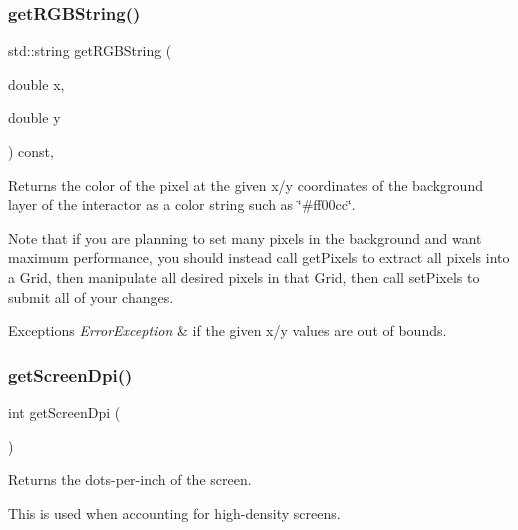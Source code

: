 \subsubsection{\texorpdfstring{get\+R\+G\+B\+String()}{getRGBString()}}
{\footnotesize\ttfamily std\+::string get\+R\+G\+B\+String (\begin{DoxyParamCaption}\item[{double}]{x,  }\item[{double}]{y }\end{DoxyParamCaption}) const\hspace{0.3cm}{\ttfamily [virtual]}, {\ttfamily [inherited]}}



Returns the color of the pixel at the given x/y coordinates of the background layer of the interactor as a color string such as \char`\"{}\#ff00cc\char`\"{}. 

Note that if you are planning to set many pixels in the background and want maximum performance, you should instead call get\+Pixels to extract all pixels into a Grid, then manipulate all desired pixels in that Grid, then call set\+Pixels to submit all of your changes.


\begin{DoxyExceptions}{Exceptions}
{\em Error\+Exception} & if the given x/y values are out of bounds. \\
\hline
\end{DoxyExceptions}
\mbox{\label{classsgl_1_1GWindow_aea783b75281f864f14e958d2fee28f9d}} 
\subsubsection{\texorpdfstring{get\+Screen\+Dpi()}{getScreenDpi()}}
{\footnotesize\ttfamily int get\+Screen\+Dpi (\begin{DoxyParamCaption}{ }\end{DoxyParamCaption})\hspace{0.3cm}{\ttfamily [static]}}



Returns the dots-\/per-\/inch of the screen. 

This is used when accounting for high-\/density screens. \mbox{\label{classsgl_1_1GWindow_ab15179b683630109f0ac256590a3b323}} 

